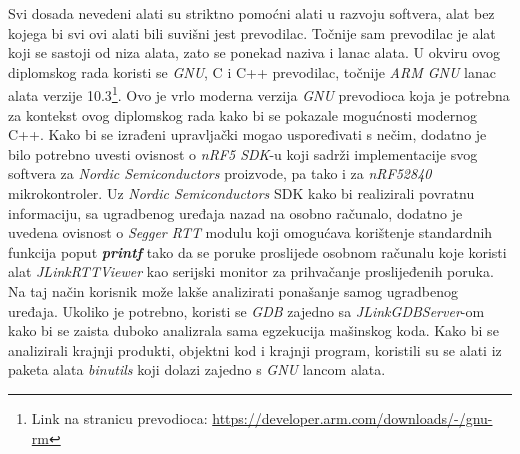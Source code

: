 Svi dosada nevedeni alati su striktno pomoćni alati u razvoju softvera, alat bez kojega bi svi ovi alati bili suvišni jest prevodilac. Točnije sam prevodilac je alat koji se sastoji od niza alata, zato se ponekad naziva i lanac alata. U okviru ovog diplomskog rada koristi se \textit{GNU}, C i C++ prevodilac, točnije \textit{ARM GNU} lanac alata verzije 10.3\footnote{Link na stranicu prevodioca: \hyperref[https://developer.arm.com/downloads/-/gnu-rm]{https://developer.arm.com/downloads/-/gnu-rm}}. Ovo je vrlo moderna verzija \textit{GNU} prevodioca koja je potrebna za kontekst ovog diplomskog rada kako bi se pokazale mogućnosti modernog C++. Kako bi se izrađeni upravljački mogao uspoređivati s nečim, dodatno je bilo potrebno uvesti ovisnost o \textit{nRF5 SDK}-u koji sadrži implementacije svog softvera za \textit{Nordic Semiconductors} proizvode, pa tako i za \textit{nRF52840} mikrokontroler. Uz \textit{Nordic Semiconductors} SDK kako bi realizirali povratnu informaciju, sa ugradbenog uređaja nazad na osobno računalo, dodatno je uvedena ovisnost o \textit{Segger RTT} modulu koji omogućava korištenje standardnih funkcija poput \textbf{\textit{printf}} tako da se poruke proslijede osobnom računalu koje koristi alat \textit{JLinkRTTViewer} kao serijski monitor za prihvačanje proslijeđenih poruka. Na taj način korisnik može lakše analizirati ponašanje samog ugradbenog uređaja. Ukoliko je potrebno, koristi se \textit{GDB} zajedno sa \textit{JLinkGDBServer}-om kako bi se zaista duboko analizrala sama egzekucija mašinskog koda. Kako bi se analizirali krajnji produkti, objektni kod i krajnji program, koristili su se alati iz paketa alata \textit{binutils} koji dolazi zajedno s \textit{GNU} lancom alata. 

